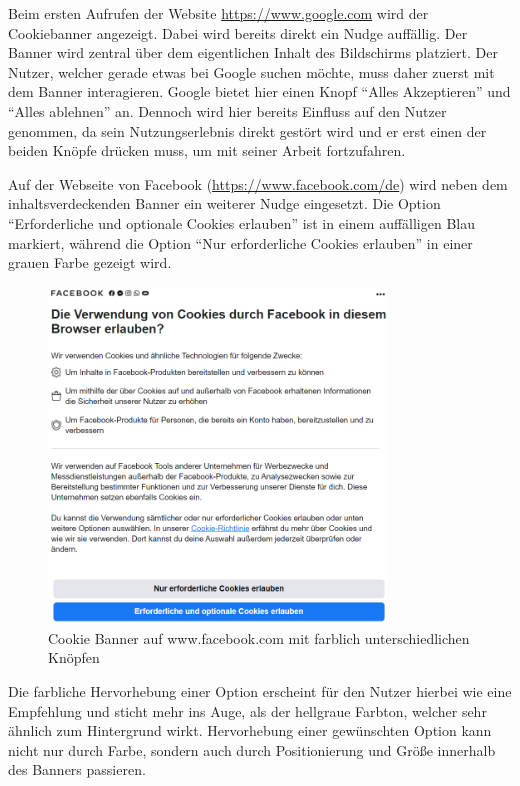 Beim ersten Aufrufen der Website \url{https://www.google.com} wird der Cookiebanner angezeigt. Dabei wird bereits direkt ein Nudge auffällig. Der Banner wird zentral über dem eigentlichen Inhalt des Bildschirms platziert. Der Nutzer, welcher gerade etwas bei Google suchen möchte, muss daher zuerst mit dem Banner interagieren. Google bietet hier einen Knopf ``Alles Akzeptieren'' und ``Alles ablehnen'' an. Dennoch wird hier bereits Einfluss auf den Nutzer genommen, da sein Nutzungserlebnis direkt gestört wird und er erst einen der beiden Knöpfe drücken muss, um mit seiner Arbeit fortzufahren.

Auf der Webseite von Facebook (\url{https://www.facebook.com/de}) wird neben dem inhaltsverdeckenden Banner ein weiterer Nudge eingesetzt. Die Option ``Erforderliche und optionale Cookies erlauben'' ist in einem auffälligen Blau markiert, während die Option ``Nur erforderliche Cookies erlauben'' in einer grauen Farbe gezeigt wird.

\begin{figure}[ht]
    \centering
    \includegraphics[width=0.8\textwidth]{Bilder/Facebook_Banner.png}
    \caption{Cookie Banner auf www.facebook.com mit farblich unterschiedlichen Knöpfen}
    \label{fig:Facebook-Cookie}
\end{figure}

Die farbliche Hervorhebung einer Option erscheint für den Nutzer hierbei wie eine Empfehlung und sticht mehr ins Auge, als der hellgraue Farbton, welcher sehr ähnlich zum Hintergrund wirkt. Hervorhebung einer gewünschten Option kann nicht nur durch Farbe, sondern auch durch Positionierung und Größe innerhalb des Banners passieren.

